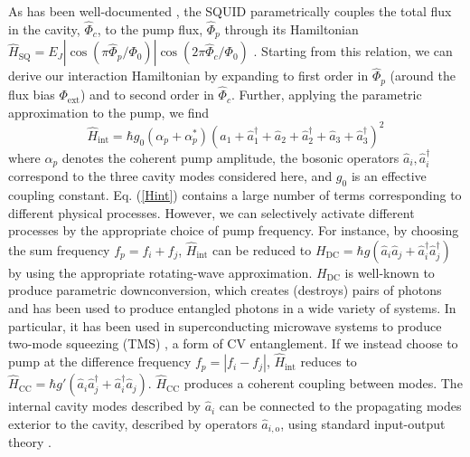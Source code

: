 \documentclass[prl,10pt,twocolumn,superscriptaddress,notitlepage,floatfix,amssymb]{revtex4}
\newcommand*{\ham}{\hat{H}}
\newcommand*{\cre}[2][a]{\hat{#1}_{#2}^{\dagger}}	%
\newcommand*{\ann}[2][a]{\hat{#1}_{#2}}
\begin{document}
As has been well-documented \cite{Yamamoto:2008cr,Wilson:2010fj,Wilson:2011ir}, the SQUID parametrically couples the total flux in the cavity, $\hat{\Phi}_{c}$, to the pump flux, $\hat{\Phi}_{p}$ through its Hamiltonian  $\hat{H}_{\text{SQ}}=E_J|\cos(\pi\hat{\Phi}_{p}/\Phi_0)|\cos(2\pi\hat{\Phi}_{c}/\Phi_0)$ \cite{Johansson:2009hf}.
Starting from this relation, we can derive our interaction Hamiltonian by expanding to first order in $\hat{\Phi}_{p}$ (around the flux bias $\Phi_{\text{ext}}$) and to  second order in  $\hat{\Phi}_{c}$.  Further, applying the parametric approximation to the pump, we find
\begin{equation}
\ham_{\text{int}}=\hbar g_0\left(\alpha_{p}+\alpha_{p}^*\right)\left(\ann[a]{1}+\cre[a]{1}+\ann[a]{2}+\cre[a]{2}+\ann[a]{3}+\cre[a]{3}\right)^2	\label{Hint}
\end{equation}
where $\alpha_p$ denotes the coherent pump amplitude, the bosonic operators $\ann[a]{i},\cre[a]{i}$ correspond to the three cavity modes considered here, and $g_0$ is an effective coupling constant. Eq. (\ref{Hint}) contains a large number of terms corresponding to different physical processes. However, we can selectively activate different processes by the appropriate choice of pump frequency. For instance, by choosing the sum frequency $f_{p}=f_i + f_j$, $\hat{H}_{\text{int}}$ can be reduced to $H_{\text{DC}}=\hbar g\left(\ann[a]{i}\ann[a]{j}+\cre[a]{i}\cre[a]{j}\right)$ by using the appropriate rotating-wave approximation.  $H_{\text{DC}}$ is well-known to produce parametric downconversion, which creates (destroys) pairs of photons and has been used to produce entangled photons in a wide variety of systems.  In particular, it has been used in superconducting microwave systems to produce two-mode squeezing (TMS) \cite{Flurin:2012hq}, a form of CV entanglement.  If we instead choose to pump at the difference frequency $f_{p}=|f_i - f_j|$, $\hat{H}_{\text{int}}$ reduces to $\hat{H}_{\text{CC}}=\hbar g'\left(\ann[a]{i}\cre[a]{j}+\cre[a]{i}\ann[a]{j}\right)$. $\hat{H}_{\text{CC}}$ produces a coherent coupling between modes.  The internal cavity modes described by $\ann[a]{i}$ can be connected to the propagating modes exterior to the cavity, described by operators $\ann[a]{i,\text{o}}$, using standard input-output theory \cite{Wustmann:2013bma}.%
\end{document}
